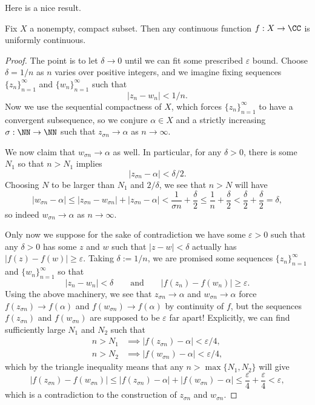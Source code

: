 Here is a nice result.
\begin{proposition} \label{prop:contcompactgetsuniform}
	Fix $X$ a nonempty, compact subset. Then any continuous function $f:X\to\CC$ is uniformly continuous.
\end{proposition}
\begin{proof}
	The point is to let $\delta\to0$ until we can fit some prescribed $\varepsilon$ bound. Choose $\delta=1/n$ as $n$ varies over positive integers, and we imagine fixing sequences $\{z_n\}_{n=1}^\infty$ and $\{w_n\}_{n=1}^\infty$ such that
	\[|z_n-w_n|<1/n.\]
	Now we use the sequential compactness of $X$, which forces $\{z_n\}_{n=1}^\infty$ to have a convergent subsequence, so we conjure $\alpha\in X$ and a strictly increasing $\sigma:\NN\to\NN$ such that $z_{\sigma n}\to\alpha$ as $n\to\infty$.

	We now claim that $w_{\sigma n}\to\alpha$ as well. In particular, for any $\delta>0$, there is some $N_1$ so that $n>N_1$ implies
	\[|z_{\sigma n}-\alpha|<\delta/2.\]
	Choosing $N$ to be larger than $N_1$ and $2/\delta$, we see that $n>N$ will have
	\[|w_{\sigma n}-\alpha|\le|z_{\sigma n}-w_{\sigma n}|+|z_{\sigma n}-\alpha|<\frac1{\sigma n}+\frac\delta2\le\frac1n+\frac\delta2<\frac\delta2+\frac\delta2=\delta,\]
	so indeed $w_{\sigma n}\to\alpha$ as $n\to\infty$.

	Only now we suppose for the sake of contradiction we have some $\varepsilon>0$ such that any $\delta>0$ has some $z$ and $w$ such that $|z-w|<\delta$ actually has $|f(z)-f(w)|\ge\varepsilon$. Taking $\delta:=1/n$, we are promised some sequences $\{z_n\}_{n=1}^\infty$ and $\{w_n\}_{n=1}^\infty$ so that
	\[|z_n-w_n|<\delta\qquad\text{and}\qquad|f(z_n)-f(w_n)|\ge\varepsilon.\]
	Using the above machinery, we see that $z_{\sigma n}\to\alpha$ and $w_{\sigma n}\to\alpha$ force $f(z_{\sigma n})\to f(\alpha)$ and $f(w_{\sigma n})\to f(\alpha)$ by continuity of $f$, but the sequences $f(z_{\sigma n})$ and $f(w_{\sigma n})$ are supposed to be $\varepsilon$ far apart! Explicitly, we can find sufficiently large $N_1$ and $N_2$ such that
	\begin{align*}
		n>N_1&\implies|f(z_{\sigma n})-\alpha|<\varepsilon/4, \\
		n>N_2&\implies|f(w_{\sigma n})-\alpha|<\varepsilon/4,
	\end{align*}
	which by the triangle inequality means that any $n>\max\{N_1,N_2\}$ will give
	\[|f(z_{\sigma n})-f(w_{\sigma n})|\le|f(z_{\sigma n})-\alpha|+|f(w_{\sigma n})-\alpha|\le\frac\varepsilon4+\frac\varepsilon4<\varepsilon,\]
	which is a contradiction to the construction of $z_{\sigma n}$ and $w_{\sigma n}$.
\end{proof}

